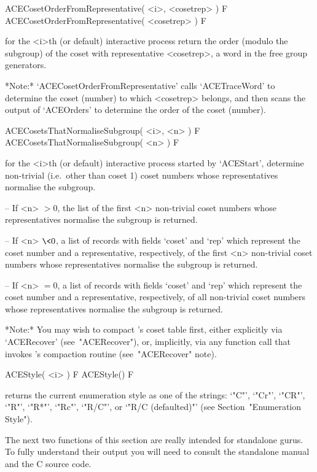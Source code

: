 \>ACECosetOrderFromRepresentative( <i>, <cosetrep> ) F
\>ACECosetOrderFromRepresentative( <cosetrep> ) F

for the <i>th (or default) interactive {\ACE} process return the order
(modulo the subgroup) of the coset with representative  <cosetrep>,  a
word in the free group generators.

*Note:*   
`ACECosetOrderFromRepresentative' calls  `ACETraceWord'  to  determine
the coset (number) to which <cosetrep> belongs,  and  then  scans  the
output of `ACEOrders' to determine the order of the coset (number).

\>ACECosetsThatNormaliseSubgroup( <i>, <n> ) F
\>ACECosetsThatNormaliseSubgroup( <n> ) F

for the <i>th (or  default)  interactive  {\ACE}  process  started  by
`ACEStart', determine non-trivial  (i.e.~other  than  coset  1)  coset
numbers whose representatives normalise the subgroup.

\beginlist%

\item{--} If <n> $> 0$, the list of the first  <n>  non-trivial  coset
numbers whose representatives normalise the subgroup is returned.

\item{--} If <n> $\< 0$, a list of records  with  fields  `coset'  and
`rep'  which  represent  the  coset  number  and   a   representative,
respectively,  of  the  first  <n>  non-trivial  coset  numbers  whose
representatives normalise the subgroup is returned.

\item{--} If <n> $= 0$, a list of  records  with  fields  `coset'  and
`rep'  which  represent  the  coset  number  and   a   representative,
respectively, of all non-trivial coset numbers  whose  representatives
normalise the subgroup is returned.

\endlist

*Note:*
You may wish to compact {\ACE}'s coset table first, either  explicitly
via `ACERecover' (see~"ACERecover"), or, implicitly, via any  function
call that invokes {\ACE}'s compaction routine (see~"ACERecover" note).

\>ACEStyle( <i> ) F
\>ACEStyle() F

returns the current enumeration style as one of  the  strings:  `"C"',
`"Cr"', `"CR"', `"R"', `"R*"', `"Rc"', `"R/C"', or `"R/C (defaulted)"'
(see Section~"Enumeration Style").

The next two functions of this section are really intended for  {\ACE}
standalone gurus. To fully understand their output you  will  need  to
consult the standalone manual and the C source code.

